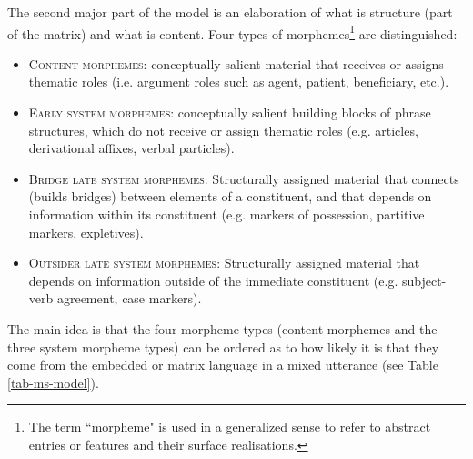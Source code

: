 The second major part of the model is an elaboration of what is structure (part of the matrix) and what is content. Four types of morphemes\footnote{The term ``morpheme" is used in a generalized sense to refer to abstract entries or features and their surface realisations.} are distinguished: 


\begin{itemize}
\itemsep0em 
    \item \textsc{Content morphemes}: conceptually salient material that receives or assigns thematic roles (i.e. argument roles such as agent, patient, beneficiary, etc.).
    \item \textsc{Early system morphemes}: conceptually salient building blocks of phrase structures, which do not receive or assign thematic roles (e.g. articles, derivational affixes, verbal particles).
    \item \textsc{Bridge late system morphemes}: Structurally assigned material that connects (builds bridges) between elements of a constituent, and that depends on information within its constituent (e.g. markers of possession, partitive markers, expletives).
    \item \textsc{Outsider late system morphemes}: Structurally assigned material that depends on information outside of the immediate constituent (e.g. subject-verb agreement, case markers).
\end{itemize}

The main idea is that the four morpheme types (content morphemes and the three system morpheme types) can be ordered as to how likely it is that they come from the embedded or matrix language in a mixed utterance (see Table \ref{tab-ms-model}). 

